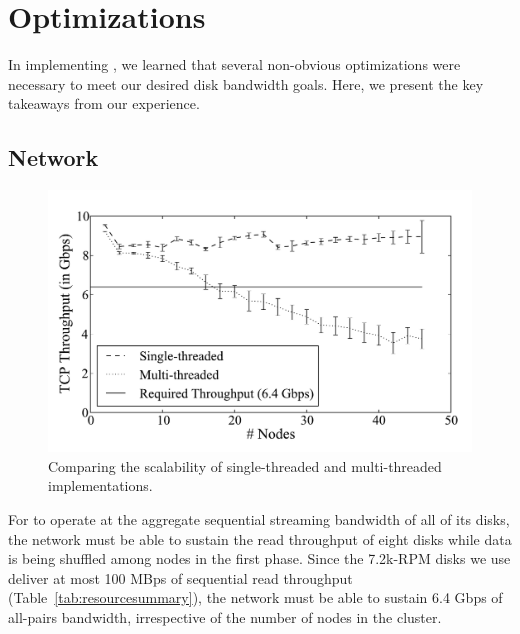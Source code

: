 \section{Optimizations}
\label{sec:optimizations}

In implementing \tritonsort, we learned that several non-obvious optimizations
were necessary to meet our desired disk bandwidth goals.  Here, we present the
key takeaways from our experience.

\subsection{Network}
\label{sec:fastnetwork}

\begin{figure}
  \centering
  \includegraphics[width=\columnwidth]{tritonsort/graphs/netscalability.pdf}

\caption{Comparing the scalability of single-threaded and
  multi-threaded \receiver implementations.}
  \label{fig:net_scalability}
\end{figure}

For \tritonsort to operate at the aggregate sequential streaming bandwidth of
all of its disks, the network must be able to sustain the read throughput of
eight disks while data is being shuffled among nodes in the first phase.  Since
the 7.2k-RPM disks we use deliver at most 100 MBps of sequential read
throughput (Table~\ref{tab:resourcesummary}), the network must be able to
sustain 6.4 Gbps of all-pairs bandwidth, irrespective of the number of nodes in
the cluster.

